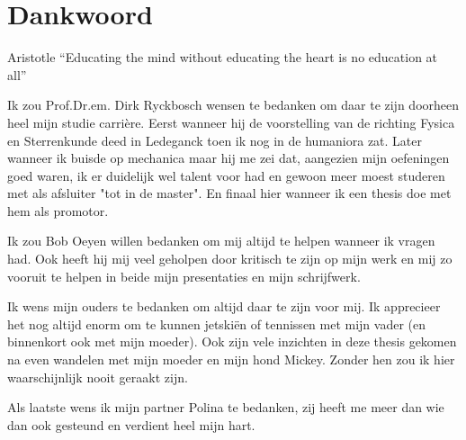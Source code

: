 \chapter*{Dankwoord}
\begin{chapquote}{Aristotle}
``Educating the mind without educating the heart is no education at all''
\end{chapquote}
Ik zou Prof.Dr.em. Dirk Ryckbosch wensen te bedanken om daar te zijn doorheen
heel mijn studie carrière. Eerst wanneer hij de voorstelling van de richting
Fysica en Sterrenkunde deed in Ledeganck toen ik nog in de humaniora zat. Later wanneer ik buisde op
mechanica maar hij me zei dat, aangezien mijn oefeningen goed waren, ik er
duidelijk wel talent voor had en gewoon meer moest studeren met als afsluiter
"tot in de master". En finaal hier wanneer ik een thesis doe met hem als
promotor.

Ik zou Bob Oeyen willen bedanken om mij altijd te helpen wanneer ik
vragen had. Ook heeft hij mij veel geholpen door kritisch te zijn op
mijn werk en mij zo vooruit te helpen in beide mijn presentaties en
mijn schrijfwerk.

Ik wens mijn ouders te bedanken om altijd daar te zijn voor mij.
Ik apprecieer het nog altijd enorm om te kunnen jetskiën of
tennissen met mijn vader (en binnenkort ook met mijn moeder).
Ook zijn vele inzichten in deze thesis gekomen na even wandelen
met mijn moeder en mijn hond Mickey.  Zonder hen zou ik hier
waarschijnlijk nooit geraakt zijn.

Als laatste wens ik mijn partner Polina te bedanken, zij heeft me
meer dan wie dan ook gesteund en verdient heel mijn hart.
